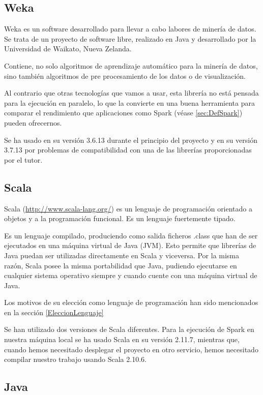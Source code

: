 \subsection{Weka}\label{sec:DefWeka}
Weka \cite{WekaSoft} es un software desarrollado para llevar a cabo labores de minería de datos. Se trata de un proyecto de software libre, realizado en Java y desarrollado por la Universidad de Waikato, Nueva Zelanda.

Contiene, no solo algoritmos de aprendizaje automático para la minería de datos, sino también algoritmos de pre procesamiento de los datos o de visualización.

Al contrario que otras tecnologías que vamos a usar, esta librería no está pensada para la ejecución en paralelo, lo que la convierte en una buena herramienta para comparar el rendimiento que aplicaciones como Spark (véase \ref{sec:DefSpark}) pueden ofrecernos.

Se ha usado en su versión 3.6.13 durante el principio del proyecto y en su versión 3.7.13 por problemas de compatibilidad con una de las librerías proporcionadas por el tutor.

\subsection{Scala}

Scala (\url{http://www.scala-lang.org/}) es un lenguaje de programación orientado a objetos y a la programación funcional. Es un lenguaje fuertemente tipado.

Es un lenguaje compilado, produciendo como salida ficheros .class que han de ser ejecutados en una máquina virtual de Java (JVM). Esto permite que librerías de Java puedan ser utilizadas directamente en Scala y viceversa. Por la misma razón, Scala posee la misma portabilidad que Java, pudiendo ejecutarse en cualquier sistema operativo siempre y cuando cuente con una máquina virtual de Java. 

Los motivos de su elección como lenguaje de programación han sido mencionados en la sección \ref{EleccionLenguaje}

Se han utilizado dos versiones de Scala diferentes. Para la ejecución de Spark en nuestra máquina local se ha usado Scala en su versión 2.11.7, mientras que, cuando hemos necesitado desplegar el proyecto en otro servicio, hemos necesitado compilar nuestro trabajo usando Scala 2.10.6.

\subsection{Java}

